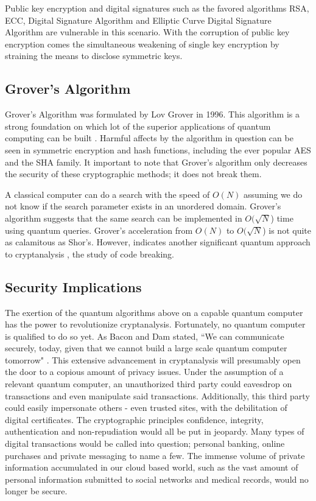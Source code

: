 Public key encryption and digital signatures such as the favored algorithms RSA, ECC, Digital Signature Algorithm and Elliptic Curve Digital Signature Algorithm are vulnerable in this scenario. With the corruption of public key encryption comes the simultaneous weakening of single key encryption by straining the means to disclose symmetric keys.

\subsection{Grover's Algorithm}
Grover's Algorithm was formulated by Lov Grover in 1996. This algorithm is a strong foundation on which lot of the superior applications of quantum computing can be built \cite{Post_Q_Cryptog}. Harmful affects by the algorithm in question can be seen in symmetric encryption and hash functions, including the ever popular AES and the SHA family. It important to note that Grover's algorithm only decreases the security of these cryptographic methods; it does not break them.

A classical computer can do a search with the speed of \(O(N)\) assuming we do not know if the search parameter exists in an unordered domain. Grover's algorithm suggests that the same search can be implemented in \(O(\sqrt{N}\)) time using quantum queries. Grover's acceleration from \(O(N)\) to \(O(\sqrt{N}\)) is not quite as calamitous as Shor's. However, indicates another significant quantum approach to cryptanalysis \cite{Quantum_Cryptanal}, the study of code breaking. 

\subsection{Security Implications}
The exertion of the quantum algorithms above on a capable quantum computer has the power to revolutionize cryptanalysis. Fortunately, no quantum computer is qualified to do so yet. As Bacon and Dam stated, ``We can communicate securely, today, given that we cannot build a large scale quantum computer tomorrow" \cite{Q_Alg}. This extensive advancement in cryptanalysis will presumably open the door to a copious amount of privacy issues. Under the assumption of a relevant quantum computer, an unauthorized third party could eavesdrop on transactions and even manipulate said transactions. Additionally, this third party could easily impersonate others - even trusted sites, with the debilitation of digital certificates. The cryptographic principles confidence, integrity, authentication and non-repudiation would all be put in jeopardy. Many types of digital transactions would be called into question; personal banking, online purchases and private messaging to name a few. The immense volume of private information accumulated in our cloud based world, such as the vast amount of personal information submitted to social networks and medical records, would no longer be secure. 

